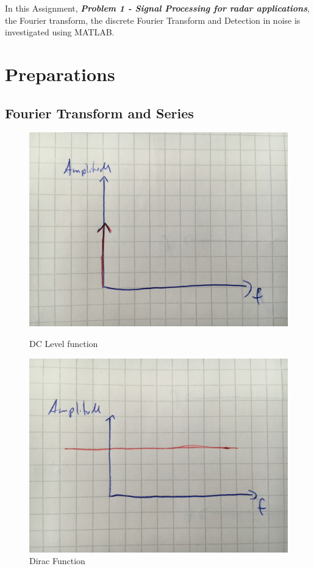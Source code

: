 \documentclass[12pt]{article}
\begin{document}
In this Assignment, \textit{\textbf{Problem 1 - Signal Processing for radar applications}}, the Fourier transform, the discrete Fourier Transform and Detection in noise is investigated using MATLAB.


\section{Preparations}

\subsection{Fourier Transform and Series}


\begin{figure}[!htbp]
  \centering
  \begin{minipage}[b]{0.45\textwidth}
    \includegraphics[width=\textwidth]{images/dc}
    \caption{DC Level function}
  \end{minipage}
  \hfill
  \begin{minipage}[b]{0.45\textwidth}
    \includegraphics[width=\textwidth]{images/dirac}
    \caption{Dirac Function}
  \end{minipage}
\end{figure}
\end{document}
